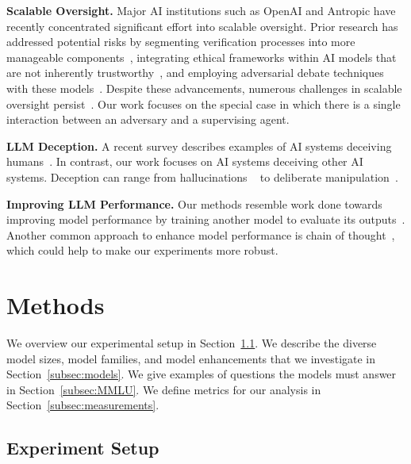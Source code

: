 \documentclass[11pt]{article}
\begin{document}
\textbf{Scalable Oversight.} Major AI institutions such as OpenAI and Antropic have recently concentrated significant effort into scalable oversight. Prior research has addressed potential risks by segmenting verification processes into more manageable components~\cite{bowman2022oversight}, integrating ethical frameworks within AI models that are not inherently trustworthy~\cite{Bai2022constitutionalAI}, and employing adversarial debate techniques with these models~\cite{Du2023debate}. Despite these advancements, numerous challenges in scalable oversight persist~\cite{Shen2023survey}. Our work focuses on the special case in which there is a single interaction between an adversary and a supervising agent.

\textbf{LLM Deception.} A recent survey describes examples of AI systems deceiving humans~\cite{DeceptionSurvey}. In contrast, our work focuses on AI systems deceiving other AI systems. Deception can range from hallucinations ~\cite{SurveyHallucinations} to deliberate manipulation~\cite{Cicero}. 

\textbf{Improving LLM Performance.} Our methods resemble work done towards improving model performance by training another model to evaluate its outputs~\cite{CobbeVerifiers}. Another common approach to enhance model performance is chain of thought~\cite{Wei2022ChainOT}, which could help to make our experiments more robust. 

\section{Methods}

\vspace{-2ex}




We overview our experimental setup in Section~\ref{subsec:overview}. We describe the diverse model sizes, model families, and model enhancements that we investigate in Section~\ref{subsec:models}. We give examples of questions the models must answer in Section~\ref{subsec:MMLU}. We define metrics for our analysis in Section~\ref{subsec:measurements}.

\subsection{Experiment Setup}
\label{subsec:overview}
\end{document}
